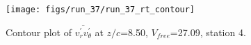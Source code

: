 \begin{figure}[H]
\centering
\texttt{[image: figs/run\_37/run\_37\_rt\_contour]}
\caption{Contour plot of $\overline{v_{r}^{\prime} v_{\theta}^{\prime}}$ at $z/c$=8.50, $V_{free}$=27.09, station 4.}
\label{fig:run_37_rt_contour}
\end{figure}


